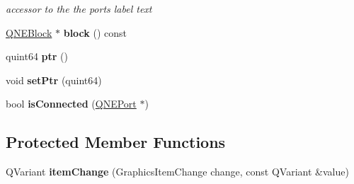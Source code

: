 \begin{DoxyCompactItemize}
\begin{DoxyCompactList}\small\item\em accessor to the the ports label text \end{DoxyCompactList}\item 
\hypertarget{class_q_n_e_port_a1c24bc9014ffb444f0abe00bc5f41866}{\hyperlink{class_q_n_e_block}{Q\-N\-E\-Block} $\ast$ {\bfseries block} () const }\label{class_q_n_e_port_a1c24bc9014ffb444f0abe00bc5f41866}

\item 
\hypertarget{class_q_n_e_port_a6ffedde045065ee5a288932c8f345be0}{quint64 {\bfseries ptr} ()}\label{class_q_n_e_port_a6ffedde045065ee5a288932c8f345be0}

\item 
\hypertarget{class_q_n_e_port_a0cb9b838cfe26e9c1d626a1647f13f7a}{void {\bfseries set\-Ptr} (quint64)}\label{class_q_n_e_port_a0cb9b838cfe26e9c1d626a1647f13f7a}

\item 
\hypertarget{class_q_n_e_port_a54aece3613f3f467a28c134d4bb22b80}{bool {\bfseries is\-Connected} (\hyperlink{class_q_n_e_port}{Q\-N\-E\-Port} $\ast$)}\label{class_q_n_e_port_a54aece3613f3f467a28c134d4bb22b80}

\end{DoxyCompactItemize}
\subsection*{Protected Member Functions}
\begin{DoxyCompactItemize}
\item 
\hypertarget{class_q_n_e_port_a778ced2a07713dd73de1f41f9d050b23}{Q\-Variant {\bfseries item\-Change} (Graphics\-Item\-Change change, const Q\-Variant \&value)}\label{class_q_n_e_port_a778ced2a07713dd73de1f41f9d050b23}

\end{DoxyCompactItemize}
